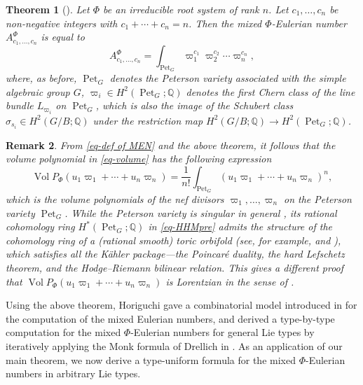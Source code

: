 \documentclass[11pt, letterpaper]{amsart}
\numberwithin{equation}{section}
\newtheorem{theorem}{Theorem}[section]
\newtheorem{remark}[theorem]{Remark}
\DeclareMathOperator{\Pet}{Pet}
\begin{document}
\begin{theorem}[]\label{thm-M=I}
    Let \(\Phi\) be an irreducible root system of rank $n$. Let \(c_1, \ldots, c_n\) be non-negative integers with \(c_1 + \cdots + c_n = n\). 
    Then the mixed \(\Phi\)-Eulerian number \(A_{c_1, \ldots, c_n}^{\Phi}\) is equal to\[A_{c_1, \ldots, c_n}^{\Phi} = \int_{\Pet_{G}} \varpi_1^{c_1} \varpi_2^{c_2} \cdots \varpi_n^{c_n},\]
    where, as before, $\Pet_{G}$ denotes the Peterson variety associated with the simple algebraic group $G$, $\varpi_i\in H^{2}(\Pet_{G};\mathbb{Q})$ denotes the first Chern class of the line bundle $L_{\varpi_{i}}$ on $\Pet_{G}$, which is also the image of the Schubert class $\sigma_{s_i} \in H^{2}(G/B;\mathbb{Q})$ under the restriction map $ H^{2}(G/B;\mathbb{Q}) \rightarrow H^{2}(\Pet_{G};\mathbb{Q})$.
\end{theorem}

\begin{remark}
From \eqref{eq-def of MEN} and the above theorem, it follows that the volume polynomial in \eqref{eq-volume} has the following expression
\begin{equation}
    \operatorname{Vol} P_{\Phi}\left(u_1 \varpi_1+\cdots+u_n \varpi_n\right)=\frac{1}{n!} \int_{\Pet_{G}}\left(u_1 \varpi_1+\cdots+u_n \varpi_n\right)^n,  
\end{equation}
which is the volume polynomials of the nef divisors $\varpi_1, \ldots, \varpi_n$ on the Peterson variety $\Pet_{G}$. While the Peterson variety is singular in general \cite[Theorem 6]{kostant1996flag}, its rational cohomology ring $H^{*}(\Pet_{G};\mathbb{Q})$ in \eqref{eq-HHMpre} admits the structure of the cohomology ring of a (rational smooth) toric orbifold (see, for example, \cite{abe2023peterson} and \cite{gui2024weyl}), which satisfies all the K\"ahler package---the Poincar\'e duality, the hard Lefschetz theorem, and the Hodge--Riemann bilinear relation. This gives a different proof that $\operatorname{Vol} P_{\Phi}\left(u_1 \varpi_1+\cdots+u_n \varpi_n\right)$ is \emph{Lorentzian} in the sense of \cite{branden2020lorentzian}.
\end{remark}

Using the above theorem, Horiguchi gave a combinatorial model introduced in \cite{abe2024geometry} for the computation of the mixed Eulerian numbers, and derived a type-by-type computation for the mixed $\Phi$-Eulerian numbers for general Lie types by iteratively applying the Monk formula of Drellich in \cite{drellich2015monk}. As an application of our main theorem, we now derive a type-uniform formula for the mixed $\Phi$-Eulerian numbers in arbitrary Lie types. 
\end{document}
